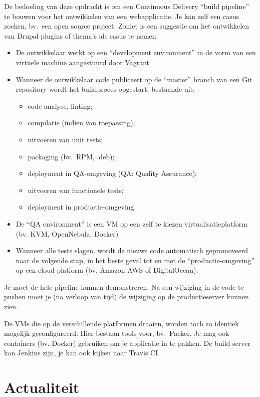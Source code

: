 De bedoeling van deze opdracht is om een Continuous Delivery ``build pipeline'' te bouwen voor het ontwikkelen van een webapplicatie. Je kan zelf een casus zoeken, bv.~een open source project. Zoniet is een suggestie om het ontwikkelen van Drupal plugins of thema's als casus te nemen.

\begin{itemize}
\item De ontwikkelaar werkt op een ``development environment'' in de vorm van een virtuele machine aangestuurd door Vagrant
\item Wanneer de ontwikkelaar code publiceert op de ``master'' branch van een Git repository wordt het buildproces opgestart, bestaande uit:

  \begin{itemize}
  \item code-analyse, linting;
  \item compilatie (indien van toepassing);
  \item uitvoeren van unit tests;
  \item packaging (bv.~RPM, .deb);
  \item deployment in QA-omgeving (QA: Quality Assurance);
  \item uitvoeren van functionele tests;
  \item deployment in productie-omgeving.
  \end{itemize}

\item De ``QA environment'' is een VM op een zelf te kiezen virtualisatieplatform (bv. KVM, OpenNebula, Docker)
\item Wanneer alle tests slagen, wordt de nieuwe code automatisch gepromoveerd naar de volgende stap, in het beste geval tot en met de ``productie-omgeving'' op een cloud-platform (bv. Amazon AWS of DigitalOcean).
\end{itemize}

Je moet de hele pipeline kunnen demonstreren. Na een wijziging in de code te pushen moet je (na verloop van tijd) de wijziging op de productieserver kunnen zien.

De VMs die op de verschillende platformen draaien, worden toch zo identiek mogelijk geconfigureerd. Hier bestaan tools voor, bv.~Packer.  Je mag ook containers (bv. Docker) gebruiken om je applicatie in te pakken. De build server kan Jenkins zijn, je kan ook kijken naar Travis CI.

\section{Actualiteit}
\label{sec:actualiteit}

